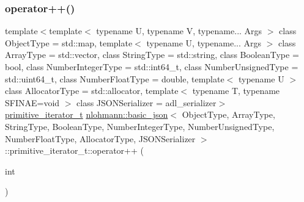 \subsubsection{\texorpdfstring{operator++()}{operator++()}\hspace{0.1cm}{\footnotesize\ttfamily [2/2]}}
{\footnotesize\ttfamily template$<$template$<$ typename U, typename V, typename... Args $>$ class Object\+Type = std\+::map, template$<$ typename U, typename... Args $>$ class Array\+Type = std\+::vector, class String\+Type  = std\+::string, class Boolean\+Type  = bool, class Number\+Integer\+Type  = std\+::int64\+\_\+t, class Number\+Unsigned\+Type  = std\+::uint64\+\_\+t, class Number\+Float\+Type  = double, template$<$ typename U $>$ class Allocator\+Type = std\+::allocator, template$<$ typename T, typename S\+F\+I\+N\+A\+E=void $>$ class J\+S\+O\+N\+Serializer = adl\+\_\+serializer$>$ \\
\hyperlink{classnlohmann_1_1basic__json_1_1primitive__iterator__t}{primitive\+\_\+iterator\+\_\+t} \hyperlink{classnlohmann_1_1basic__json}{nlohmann\+::basic\+\_\+json}$<$ Object\+Type, Array\+Type, String\+Type, Boolean\+Type, Number\+Integer\+Type, Number\+Unsigned\+Type, Number\+Float\+Type, Allocator\+Type, J\+S\+O\+N\+Serializer $>$\+::primitive\+\_\+iterator\+\_\+t\+::operator++ (\begin{DoxyParamCaption}\item[{int}]{ }\end{DoxyParamCaption})\hspace{0.3cm}{\ttfamily [inline]}}

\mbox{\label{classnlohmann_1_1basic__json_1_1primitive__iterator__t_a1bcc58a5506cd8a4ee864f59c2ea4942}} 
